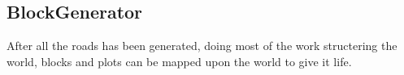 \subsection{BlockGenerator}
After all the roads has been generated, doing most of the work structering the world, blocks and plots can be mapped upon the world to give it life. 
